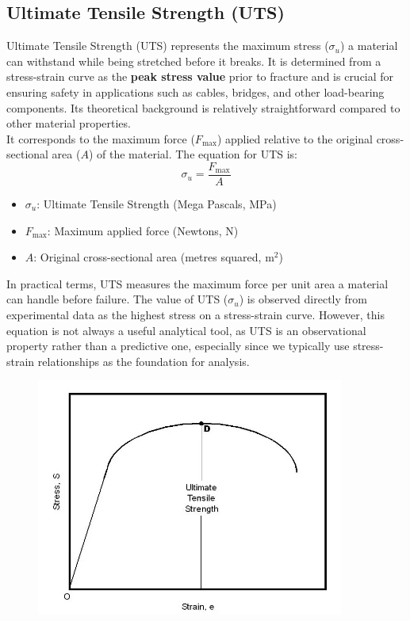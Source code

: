 \documentclass{article}
\begin{document}
{\subsection{Ultimate Tensile Strength (UTS)}
Ultimate Tensile Strength (UTS) represents the maximum stress ($\sigma_{u}$) a material can withstand while being stretched before it breaks. It is determined from a stress-strain curve as the \textbf{peak stress value} prior to fracture and is crucial for ensuring safety in applications such as cables, bridges, and other load-bearing components. Its theoretical background is relatively straightforward compared to other material properties.\\[8pt]
It corresponds to the maximum force ($F_{\text{max}}$) applied relative to the original cross-sectional area ($A$) of the material. The equation for UTS is:
\begin{equation}
    \sigma_{u} = \frac{F_{\text{max}}}{A}
\end{equation}
\begin{itemize}[itemsep=-1mm]
    \item $\sigma_{u}$: Ultimate Tensile Strength (Mega Pascals, MPa)
    \item $F_{\text{max}}$: Maximum applied force (Newtons, N)
    \item $A$: Original cross-sectional area (metres squared, $\text{m}^2$)
\end{itemize}
In practical terms, UTS measures the maximum force per unit area a material can handle before failure. The value of UTS ($\sigma_{u}$) is observed directly from experimental data as the highest stress on a stress-strain curve. However, this equation is not always a useful analytical tool, as UTS is an observational property rather than a predictive one, especially since we typically use stress-strain relationships as the foundation for analysis.
\begin{center}
    \begin{minipage}{0.47\textwidth}\centering
        \begin{figure}[H]
            \centering
            \includegraphics[width=0.9\textwidth]{images/ultimate-tensile-strength.png}

\end{figure}
\end{minipage}
\end{center}}
\end{document}
